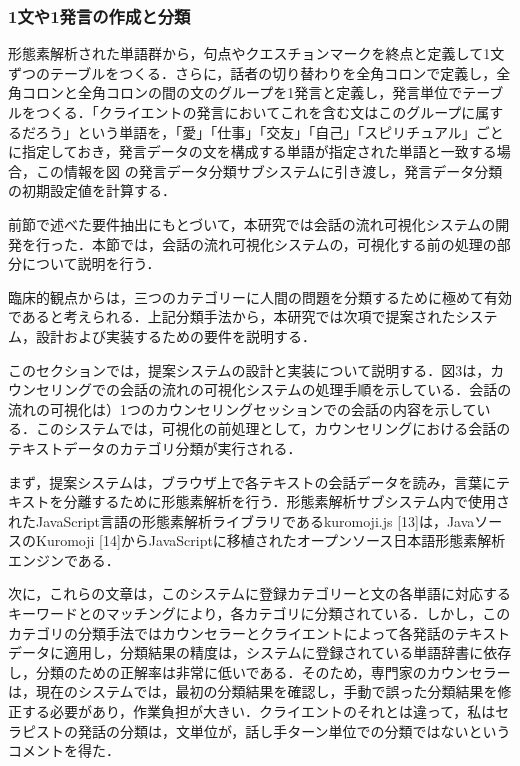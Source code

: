 \documentclass[shuuron]{kuee}
\begin{document}
\subsubsection{1文や1発言の作成と分類}%
形態素解析された単語群から，句点やクエスチョンマークを終点と定義して1文ずつのテーブルをつくる．さらに，話者の切り替わりを全角コロンで定義し，全角コロンと全角コロンの間の文のグループを1発言と定義し，発言単位でテーブルをつくる．「クライエントの発言においてこれを含む文はこのグループに属するだろう」という単語を，「愛」「仕事」「交友」「自己」「スピリチュアル」ごとに指定しておき，発言データの文を構成する単語が指定された単語と一致する場合，この情報を図
の発言データ分類サブシステムに引き渡し，発言データ分類の初期設定値を計算する．


前節で述べた要件抽出にもとづいて，本研究では会話の流れ可視化システムの開発を行った．本節では，会話の流れ可視化システムの，可視化する前の処理の部分について説明を行う．


臨床的観点からは，三つのカテゴリーに人間の問題を分類するために極めて有効であると考えられる．上記分類手法から，本研究では次項で提案されたシステム，設計および実装するための要件を説明する．

このセクションでは，提案システムの設計と実装について説明する．図3は，カウンセリングでの会話の流れの可視化システムの処理手順を示している．会話の流れの可視化は）1つのカウンセリングセッションでの会話の内容を示している．このシステムでは，可視化の前処理として，カウンセリングにおける会話のテキストデータのカテゴリ分類が実行される．

まず，提案システムは，ブラウザ上で各テキストの会話データを読み，言葉にテキストを分離するために形態素解析を行う．形態素解析サブシステム内で使用されたJavaScript言語の形態素解析ライブラリであるkuromoji.js [13]は，JavaソースのKuromoji [14]からJavaScriptに移植されたオープンソース日本語形態素解析エンジンである．

次に，これらの文章は，このシステムに登録カテゴリーと文の各単語に対応するキーワードとのマッチングにより，各カテゴリに分類されている．しかし，このカテゴリの分類手法ではカウンセラーとクライエントによって各発話のテキストデータに適用し，分類結果の精度は，システムに登録されている単語辞書に依存し，分類のための正解率は非常に低いである．そのため，専門家のカウンセラーは，現在のシステムでは，最初の分類結果を確認し，手動で誤った分類結果を修正する必要があり，作業負担が大きい．クライエントのそれとは違って，私はセラピストの発話の分類は，文単位が，話し手ターン単位での分類ではないというコメントを得た．
\end{document}
